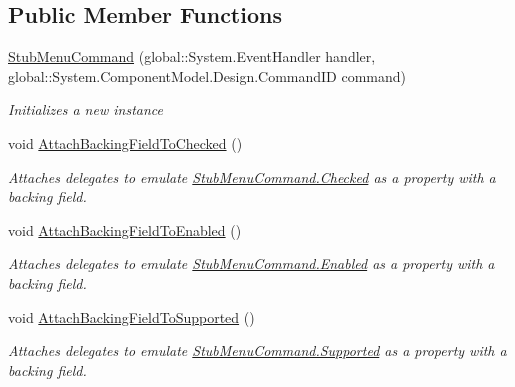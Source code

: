 \subsection*{Public Member Functions}
\begin{DoxyCompactItemize}
\item 
\hyperlink{class_system_1_1_component_model_1_1_design_1_1_fakes_1_1_stub_menu_command_a4a1972d93cf7560a7105d08dc6dbcd40}{Stub\-Menu\-Command} (global\-::\-System.\-Event\-Handler handler, global\-::\-System.\-Component\-Model.\-Design.\-Command\-I\-D command)
\begin{DoxyCompactList}\small\item\em Initializes a new instance\end{DoxyCompactList}\item 
void \hyperlink{class_system_1_1_component_model_1_1_design_1_1_fakes_1_1_stub_menu_command_a63e7d0f6f885f6dd70dffbb71b70ea96}{Attach\-Backing\-Field\-To\-Checked} ()
\begin{DoxyCompactList}\small\item\em Attaches delegates to emulate \hyperlink{class_system_1_1_component_model_1_1_design_1_1_fakes_1_1_stub_menu_command_a299c1025a63b471575ad66e06509af09}{Stub\-Menu\-Command.\-Checked} as a property with a backing field.\end{DoxyCompactList}\item 
void \hyperlink{class_system_1_1_component_model_1_1_design_1_1_fakes_1_1_stub_menu_command_a1d746ef5fe5fb153473e1064b4befa71}{Attach\-Backing\-Field\-To\-Enabled} ()
\begin{DoxyCompactList}\small\item\em Attaches delegates to emulate \hyperlink{class_system_1_1_component_model_1_1_design_1_1_fakes_1_1_stub_menu_command_a3aed3d67b17aca46132d9aec0813aa22}{Stub\-Menu\-Command.\-Enabled} as a property with a backing field.\end{DoxyCompactList}\item 
void \hyperlink{class_system_1_1_component_model_1_1_design_1_1_fakes_1_1_stub_menu_command_a5a55efa9790936cae1d7605cfb9a372b}{Attach\-Backing\-Field\-To\-Supported} ()
\begin{DoxyCompactList}\small\item\em Attaches delegates to emulate \hyperlink{class_system_1_1_component_model_1_1_design_1_1_fakes_1_1_stub_menu_command_ab6efb3bd855573d5443d47f6b1eeb366}{Stub\-Menu\-Command.\-Supported} as a property with a backing field.\end{DoxyCompactList}\item 

\end{DoxyCompactItemize}
